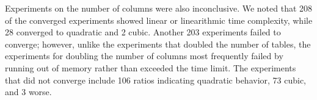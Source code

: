 Experiments on the number of columns were also inconclusive.  We noted that 208 of the converged experiments showed
linear or linearithmic time complexity, while 28 converged to quadratic and 2 cubic.  Another 203 experiments failed to
converge; however, unlike the experiments that doubled the number of tables, the experiments for doubling the number of
columns most frequently failed by running out of memory rather than exceeded the time limit. The experiments that did not
converge include 106 ratios indicating quadratic behavior, 73 cubic, and 3 worse.


